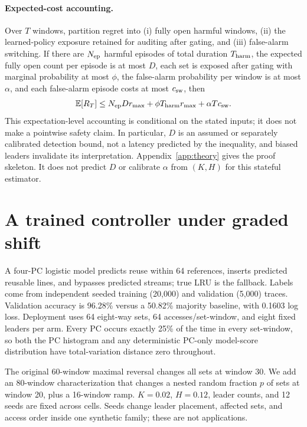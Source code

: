 \documentclass{article}
\newcommand{\rmax}{r_{\max}}
\begin{document}
\paragraph{Expected-cost accounting.}
Over $T$ windows,
partition regret into (i) fully open harmful windows, (ii) the learned-policy
exposure retained for auditing after gating, and (iii) false-alarm switching.
If there are $N_{\rm ep}$ harmful episodes of total duration $T_{\rm harm}$,
the expected fully open count per episode is at most $D$,
each set is exposed after gating with marginal probability at most $\phi$, the
false-alarm probability per window is at most $\alpha$, and each false-alarm
episode costs at most $c_{\rm sw}$, then
\begin{equation}
 \mathbb E[R_T]\le N_{\rm ep}D\rmax+\phi T_{\rm harm}\rmax
             +\alpha T c_{\rm sw}.                          \label{eq:floor}
\end{equation}
This expectation-level accounting is conditional on the stated inputs; it
does not make a pointwise safety claim.  In particular, $D$ is an assumed or
separately calibrated detection bound, not a latency predicted by the inequality,
and biased leaders invalidate its interpretation.  Appendix~\ref{app:theory}
gives the proof skeleton.  It does not predict $D$ or calibrate $\alpha$ from
$(K,H)$ for this stateful estimator.

\section{A trained controller under graded shift}

A four-PC logistic model predicts reuse within 64 references, inserts predicted
reusable lines, and bypasses predicted streams; true LRU is the fallback.  Labels
come from independent seeded training (20,000) and validation (5,000) traces.
Validation accuracy is 96.28\% versus a 50.82\% majority baseline, with 0.1603
log loss.  Deployment uses 64 eight-way sets, 64 accesses/set-window, and eight
fixed leaders per arm.  Every PC occurs exactly 25\% of the time in every
set-window, so both the PC histogram and any deterministic PC-only model-score
distribution have total-variation distance zero throughout.

The original 60-window maximal reversal changes all sets at window 30.  We add
an 80-window characterization that changes a nested random fraction $p$ of sets
at window 20, plus a 16-window ramp.  $K=0.02$, $H=0.12$, leader counts, and 12
seeds are fixed across cells.  Seeds change leader placement, affected sets, and
access order inside one synthetic family; these are not applications.
\end{document}
